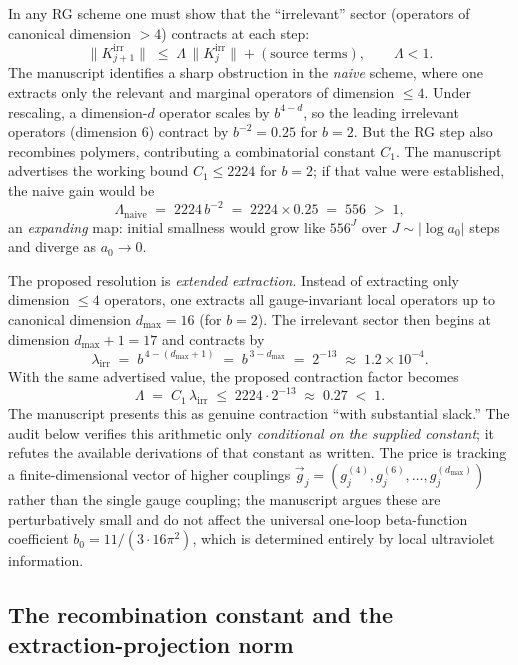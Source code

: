 \documentclass[11pt]{article}
\theoremstyle{definition}
\newcommand{\Lirr}{\lambda_{\mathrm{irr}}}
\newcommand{\dmax}{d_{\max}}
\begin{document}
In any RG scheme one must show that the ``irrelevant'' sector (operators of
canonical dimension $>4$) contracts at each step:
\[
  \| K^{\mathrm{irr}}_{j+1}\| \;\leq\; \Lambda\, \|K^{\mathrm{irr}}_{j}\| + (\text{source terms}),
  \qquad \Lambda < 1.
\]
The manuscript identifies a sharp obstruction in the \emph{naive} scheme, where
one extracts only the relevant and marginal operators of dimension $\leq 4$.
Under rescaling, a dimension-$d$ operator scales by $b^{4-d}$, so the leading
irrelevant operators (dimension $6$) contract by $b^{-2} = 0.25$ for $b=2$. But
the RG step also recombines polymers, contributing a combinatorial constant
$C_1$. The manuscript advertises the working bound $C_1 \leq 2224$ for $b=2$;
if that value were established, the naive gain would be
\[
  \Lambda_{\mathrm{naive}} \;=\; 2224\, b^{-2} \;=\; 2224 \times 0.25 \;=\; 556 \;>\; 1,
\]
an \emph{expanding} map: initial smallness would grow like $556^{J}$ over
$J\sim|\log a_0|$ steps and diverge as $a_0\to 0$.

The proposed resolution is \emph{extended extraction}. Instead of extracting
only dimension $\leq 4$ operators, one extracts all gauge-invariant local
operators up to canonical dimension $\dmax = 16$ (for $b=2$). The irrelevant
sector then begins at dimension $\dmax+1 = 17$ and contracts by
\[
  \Lirr \;=\; b^{\,4-(\dmax+1)} \;=\; b^{\,3-\dmax} \;=\; 2^{-13} \;\approx\; 1.2\times 10^{-4}.
\]
With the same advertised value, the proposed contraction factor becomes
\[
  \boxed{\;\Lambda \;=\; C_1\,\Lirr \;\leq\; 2224 \cdot 2^{-13} \;\approx\; 0.27 \;<\; 1.\;}
\]
The manuscript presents this as genuine contraction ``with substantial slack.''
The audit below verifies this arithmetic only \emph{conditional on the supplied
constant}; it refutes the available derivations of that constant as written.
The price is tracking a finite-dimensional vector of higher couplings
$\vec g_j = (g_j^{(4)},g_j^{(6)},\dots,g_j^{(\dmax)})$ rather than the single
gauge coupling; the manuscript argues these are perturbatively small and do not
affect the universal one-loop beta-function coefficient
$b_0 = 11/(3\cdot 16\pi^2)$, which is determined entirely by local ultraviolet
information.

\subsection{The recombination constant and the extraction-projection norm}
\end{document}
